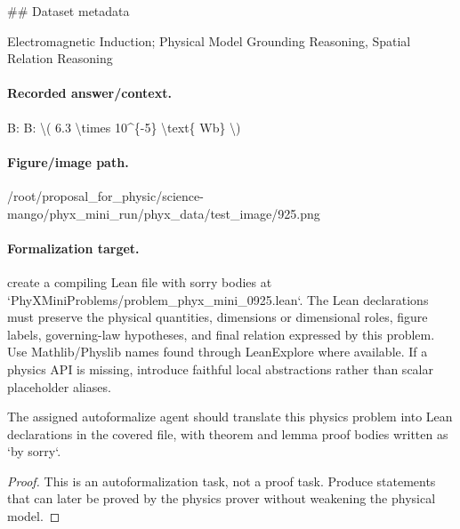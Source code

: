 \#\# Dataset metadata

Electromagnetic Induction; Physical Model Grounding Reasoning, Spatial Relation Reasoning

\paragraph{Recorded answer/context.}
B: B: \textbackslash{}( 6.3 \textbackslash{}times 10\textasciicircum{}\{-5\} \textbackslash{}text\{ Wb\} \textbackslash{})

\paragraph{Figure/image path.}
/root/proposal\_for\_physic/science-mango/phyx\_mini\_run/phyx\_data/test\_image/925.png

\paragraph{Formalization target.}
create a compiling Lean file with sorry bodies at `PhyXMiniProblems/problem\_phyx\_mini\_0925.lean`. The Lean declarations must preserve the physical quantities, dimensions or dimensional roles, figure labels, governing-law hypotheses, and final relation expressed by this problem.
Use Mathlib/Physlib names found through LeanExplore where available. If a physics API is missing, introduce faithful local abstractions rather than scalar placeholder aliases.

\begin{theorem}
\label{thm:physics:phyx_mini_0925:target}
The assigned autoformalize agent should translate this physics problem into Lean declarations in the covered file, with theorem and lemma proof bodies written as `by sorry`.
\end{theorem}
\begin{proof}
This is an autoformalization task, not a proof task. Produce statements that can later be proved by the physics prover without weakening the physical model.
\end{proof}


